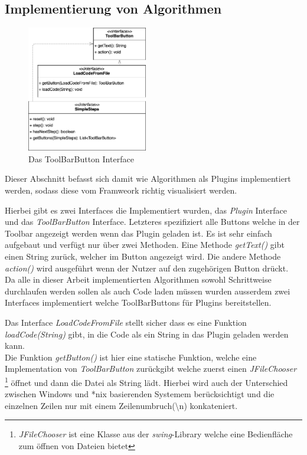 \subsection{Implementierung von Algorithmen}
\begin{figure}
  \centering
  \includegraphics[width=0.47\textwidth]{fig/GUI_ToolBar_classes_methods.png}
  \caption{Das ToolBarButton Interface}
  \label{fig:ToolBarButtons}
\end{figure}


Dieser Abschnitt befasst sich damit wie Algorithmen als Plugins implementiert werden,
sodass diese vom Framweork richtig visualisiert werden.

Hierbei gibt es zwei Interfaces die Implementiert wurden, das \textit{Plugin} Interface
und das \textit{ToolBarButton} Interface.
Letzteres spezifiziert alle Buttons welche in der Toolbar angezeigt werden
wenn das Plugin geladen ist. Es ist sehr einfach aufgebaut und verfügt nur über zwei Methoden.
Eine Methode \textit{getText()} gibt einen String zurück, welcher im Button angezeigt wird.
Die andere Methode \textit{action()} wird ausgeführt wenn der Nutzer auf den zugehörigen Button drückt.\\
Da alle in dieser Arbeit implementierten Algorithmen sowohl Schrittweise durchlaufen werden
sollen als auch Code laden müssen wurden ausserdem zwei Interfaces implementiert
welche ToolBarButtons für Plugins bereitstellen.

Das Interface \textit{LoadCodeFromFile} stellt sicher dass es eine Funktion \textit{loadCode(String)}
gibt, in die Code als ein String in das Plugin geladen werden kann.\\
Die Funktion \textit{getButton()} ist hier eine statische Funktion, welche eine Implementation
von \textit{ToolBarButton} zurückgibt welche zuerst einen \textit{JFileChooser}
\footnote{\textit{JFileChooser} ist eine Klasse aus der \textit{swing}-Library welche eine Bedienfläche zum öffnen von Dateien bietet}
öffnet und dann die Datei als String lädt. Hierbei wird auch der Unterschied
zwischen Windows und *nix basierenden Systemem berücksichtigt und die einzelnen
Zeilen nur mit einem Zeilenumbruch(\textbackslash n) konkateniert.

